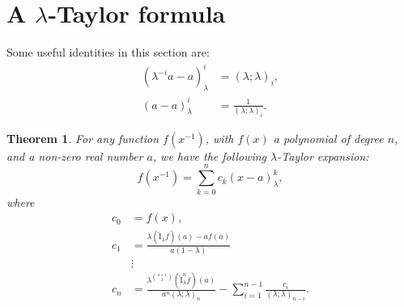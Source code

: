 \documentclass[12pt]{article}
\newcommand{\I}{\widehat{\mathrm{I}}}
\newtheorem{theorem}{Theorem}
\begin{document}
\section{A $\lambda$-Taylor formula}\label{sec7}

Some useful identities in this section are:
\begin{align}
    (\lambda^{-i}a-a)_{\lambda}^i&=(\lambda;\lambda)_{i},\\
    (a-a)_{\lambda}^i&=\frac{1}{(\lambda;\lambda)_{i}}.
\end{align}

\begin{theorem}
For any function $f(x^{-1})$, with $f(x)$ a polynomial of degree $n$, and a non-zero real number $a$, we have the following $\lambda$-Taylor expansion:
\begin{equation}
    f(x^{-1})=\sum_{k=0}^{n}c_{k}(x-a)_{\lambda}^{k},
\end{equation}
where
\begin{align*}
    c_{0}&=f(x),\\
    c_{1}&=\frac{\lambda(\I_{\lambda}f)(a)-af(a)}{a(1-\lambda)}\\
    &\vdots\\
    c_{n}&=\frac{\lambda^{\binom{n+1}{2}}(\I_{\lambda}^{n}f)(a)}{a^n(\lambda;\lambda)_{n}}-\sum_{i=1}^{n-1}\frac{c_{i}}{(\lambda;\lambda)_{n-i}}.
\end{align*}
\end{theorem}
\end{document}
